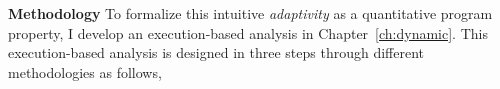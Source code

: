 \begin{enumerate}
\textbf{Methodology}
 To formalize this intuitive \emph{adaptivity} as a quantitative program property, 
I develop an execution-based analysis in Chapter~\ref{ch:dynamic}.
 This execution-based analysis is designed in three steps through different methodologies as follows,

\end{enumerate}
